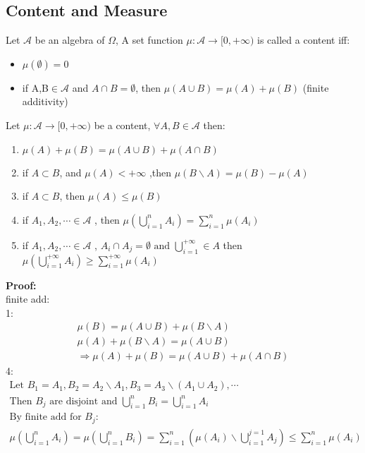 \subsection{Content and Measure}
\begin{definition}[Content]{}
Let $ \mathcal{A} $ be an algebra of $ \Omega $, A set function $ \mu: \mathcal{A} \rightarrow [0,+\infty) $ is called a content iff:
\begin{itemize}
\item $ \mu(\emptyset)=0 $
\item if A,B$\in \mathcal{A} $ and $ A\cap B=\emptyset $, then $ \mu(A\cup B)=\mu(A)+\mu(B) $ (finite additivity)
\end{itemize}
\end{definition}
\begin{lemma}[]{}
Let $ \mu:\mathcal{A} \rightarrow [0,+\infty)  $ be a content, $ \forall A,B \in \mathcal{A}  $ then:
 \begin{enumerate}[label=\circled{\arabic*}] 
 \item $ \mu(A)+\mu(B)=\mu(A\cup B)+\mu(A\cap B) $ 
 \item if $ A\subset B $, and $ \mu(A)<+\infty $ ,then $\mu(B\backslash A)=\mu(B)-\mu(A) $
 \item if $ A\subset B $, then $ \mu(A)\leq \mu(B) $
 \item if $ A_1,A_2,\cdots \in \mathcal{A} $ , then $ \mu(\bigcup_{i=1}^nA_i)=\sum_{i=1}^n\mu(A_i) $
 \item if $ A_1,A_2,\cdots \in \mathcal{A} $ , $ A_i\cap A_j=\emptyset \text{ and } \bigcup_{i=1}^{+\infty}\in A $ then $ \mu(\bigcup_{i=1}^{+\infty}A_i)\geq \sum_{i=1}^{+\infty}\mu(A_i) $
 \end{enumerate}
\end{lemma}
\textbf{Proof:}
\\finite add:
\\1:\begin{align*}{}{}
\mu(B)=\mu(A\cup B)+\mu(B\backslash A)\\
\mu(A)+\mu(B\backslash A)=\mu(A\cup B)\\
\Rightarrow \mu(A)+\mu(B)=\mu(A\cup B)+\mu(A\cap B)
\end{align*}
4:\begin{align*}{}{}
\text{Let } B_1=A_1,B_2=A_2\backslash A_1,B_3=A_3\backslash(A_1\cup A_2),\cdots\\
\text{Then } B_j \text{ are disjoint and }\bigcup_{i=1}^{n}B_i=\bigcup_{i=1}^{n}A_i \\
\text{By finite add for }B_j:\\
\mu(\bigcup_{i=1}^{n}A_i)=\mu(\bigcup_{i=1}^{n}B_i)=\sum_{i=1}^{n}(\mu(A_i)\backslash \bigcup_{i=1}^{j=1}A_j) \leq \sum_{i=1}^{n}\mu(A_i)
\end{align*}
